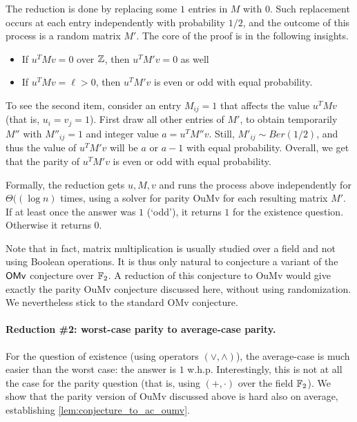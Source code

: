 \documentclass[letter,11pt]{article}
\newcommand{\omv}{\textnormal{\textsf{OMv}}\xspace}
\newcommand{\oumv}{\textnormal{\textsf{OuMv}}\xspace}
\begin{document}
The reduction is done by replacing some $1$ entries in $M$ with $0$. Such replacement occurs at each entry independently with probability $1/2$, and the outcome of this process is a random matrix $M'$.
The core of the proof is in the following insights.
\begin{itemize}
	\item If $u^T M v = 0$ over $\mathbb{Z}$, then $u^T M' v = 0$ as well
	
	\item If $u^T M v = \ell > 0$, then $u^T M' v$ is even or odd with equal probability.
\end{itemize}

To see the second item, consider an entry $M_{ij} = 1$ that affects the value $u^T M v$ (that is, $u_i = v_j = 1$).
First draw all other entries of $M'$, to obtain temporarily $M''$ with $M''_{ij} = 1$ and integer value $a = u^T M'' v$.
Still, $M'_{ij} \sim Ber(1/2)$, and thus the value of $u^T M' v$ will be $a$ or $a-1$ with equal probability.
Overall, we get that the parity of $u^T M' v$ is even or odd with equal probability.

Formally, the reduction gets $u, M, v$ and runs the process above independently for $\Theta(\left(\log n\right)$ times, using a solver for parity \oumv for each resulting matrix $M'$.
If at least once the answer was $1$ (`odd'), it returns $1$ for the existence question. Otherwise it returns $0$.

Note that in fact, matrix multiplication is usually studied over a field and not using Boolean operations. 
It is thus only natural to conjecture a variant of the $\omv$ conjecture over $\mathbb{F}_2$.
A reduction of this conjecture to \oumv would give exactly the parity \oumv conjecture discussed here, without using randomization.
We nevertheless stick to the standard \omv conjecture.

\paragraph{Reduction \#2: worst-case parity to average-case parity.}
For the question of existence (using operators $(\vee, \wedge)$), the average-case is much easier than the worst case: the answer is $1$ w.h.p.
Interestingly, this is not at all the case for the parity question (that is, using $(+, \cdot)$ over the field $\mathbb{F}_2$).
We show that the parity version of \oumv discussed above is hard also on average, establishing \cref{lem:conjecture_to_ac_oumv}.
\end{document}
